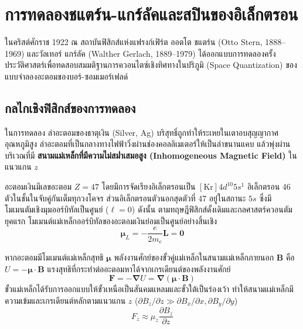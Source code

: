 \section{การทดลองชแตร์น-แกร์ลัคและสปินของอิเล็กตรอน}

ในคริสต์ศักราช 1922 ณ สถาบันฟิสิกส์แห่งแฟรงก์เฟิร์ต ออตโต ชแตร์น (Otto Stern, 1888--1969) และวัลเทอร์ แกร์ลัค (Walther Gerlach, 1889--1979) ได้ออกแบบการทดลองครั้งประวัติศาสตร์เพื่อทดสอบสมมติฐานการควอนไตซ์เชิงทิศทางในปริภูมิ (Space Quantization) ของแบบจำลองอะตอมของบอร์-ซอมเมอร์เฟลด์

\subsection{กลไกเชิงฟิสิกส์ของการทดลอง}
ในการทดลอง ลำอะตอมของธาตุเงิน (Silver, Ag) บริสุทธิ์ถูกทำให้ระเหยในเตาอบสุญญากาศอุณหภูมิสูง ลำอะตอมที่เป็นกลางทางไฟฟ้าวิ่งผ่านช่องคอลลิเมเตอร์ให้เป็นลำขนานแคบ แล้วพุ่งผ่านบริเวณที่มี \textbf{สนามแม่เหล็กที่มีความไม่สม่ำเสมอสูง (Inhomogeneous Magnetic Field)} ในแนวแกน $z$

อะตอมเงินมีเลขอะตอม $Z = 47$ โดยมีการจัดเรียงอิเล็กตรอนเป็น $[\text{Kr}] 4d^{10} 5s^1$ อิเล็กตรอน 46 ตัวในชั้นในจับคู่กันเต็มทุกวงโคจร ส่วนอิเล็กตรอนตัวนอกสุดตัวที่ 47 อยู่ในสถานะ $5s$ ซึ่งมีโมเมนตัมเชิงมุมออร์บิทัลเป็นศูนย์ ($\ell = 0$) ดังนั้น ตามทฤษฎีฟิสิกส์ดั้งเดิมและกลศาสตร์ควอนตัมยุคแรก โมเมนต์แม่เหล็กออร์บิทัลของอะตอมเงินย่อมเป็นศูนย์อย่างสิ้นเชิง
\begin{equation}
\boldsymbol{\mu}_L = -\frac{e}{2m_e}\mathbf{L} = \mathbf{0}
\end{equation}

หากอะตอมมีโมเมนต์แม่เหล็กสุทธิ $\boldsymbol{\mu}$ พลังงานศักย์ของขั้วคู่แม่เหล็กในสนามแม่เหล็กภายนอก $\mathbf{B}$ คือ $U = -\boldsymbol{\mu}\cdot\mathbf{B}$ แรงสุทธิที่กระทำต่ออะตอมหาได้จากเกรเดียนต์ของพลังงานศักย์
\begin{equation}
\mathbf{F} = -\boldsymbol{\nabla} U = \boldsymbol{\nabla}(\boldsymbol{\mu}\cdot\mathbf{B})
\end{equation}
ขั้วแม่เหล็กได้รับการออกแบบให้ขั้วเหนือเป็นสันคมแหลมและขั้วใต้เป็นร่องเว้า ทำให้สนามแม่เหล็กมีความเข้มและเกรเดียนต์หลักตามแนวแกน $z$ ($\partial B_z/\partial z \gg \partial B_x/\partial x, \partial B_y/\partial y$)
\begin{equation}
F_z \approx \mu_z \frac{\partial B_z}{\partial z}
\label{eq:stern_gerlach_force}
\end{equation}

